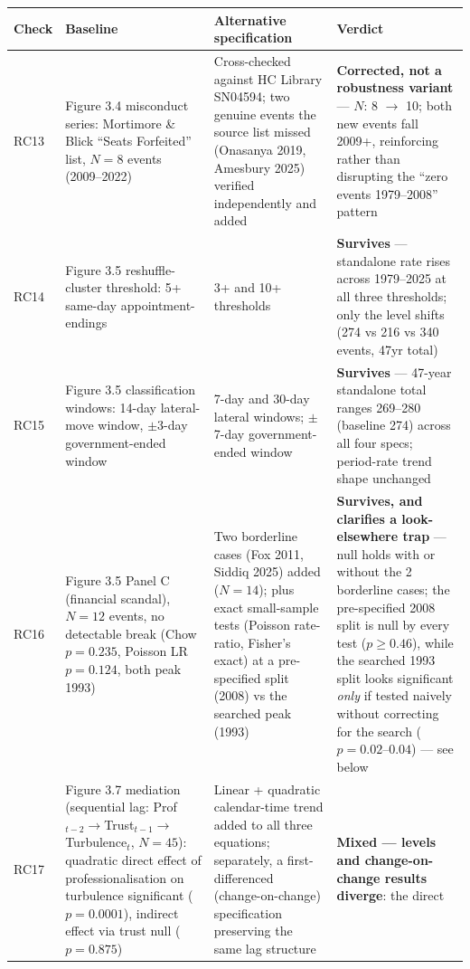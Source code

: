 \begin{threeparttable}
\caption{Robustness checks, Chapter Three}
\label{tab:ch03robustness}
\begin{tabular}{p{1.1cm} p{3.5cm} p{4.3cm} p{3.6cm}}
\toprule
Check & Baseline & Alternative specification & Verdict \\
\midrule
RC13 & Figure 3.4 misconduct series: Mortimore \& Blick ``Seats Forfeited'' list, $N=8$ events
(2009--2022) & Cross-checked against HC Library SN04594; two genuine events the source list missed
(Onasanya 2019, Amesbury 2025) verified independently and added &
\textbf{Corrected, not a robustness variant} --- $N$: 8 $\rightarrow$ 10; both new events fall
2009+, reinforcing rather than disrupting the ``zero events 1979--2008'' pattern \\
RC14 & Figure 3.5 reshuffle-cluster threshold: 5+ same-day appointment-endings & 3+ and 10+
thresholds & \textbf{Survives} --- standalone rate rises across 1979--2025 at all three
thresholds; only the level shifts (274 vs 216 vs 340 events, 47yr total) \\
RC15 & Figure 3.5 classification windows: 14-day lateral-move window, $\pm$3-day
government-ended window & 7-day and 30-day lateral windows; $\pm$7-day government-ended window &
\textbf{Survives} --- 47-year standalone total ranges 269--280 (baseline 274) across all four
specs; period-rate trend shape unchanged \\
RC16 & Figure 3.5 Panel C (financial scandal), $N=12$ events, no detectable break (Chow $p=0.235$,
Poisson LR $p=0.124$, both peak 1993) & Two borderline cases (Fox 2011, Siddiq 2025) added
($N=14$); plus exact small-sample tests (Poisson rate-ratio, Fisher's exact) at a pre-specified
split (2008) vs the searched peak (1993) & \textbf{Survives, and clarifies a look-elsewhere trap}
--- null holds with or without the 2 borderline cases; the pre-specified 2008 split is null by
every test ($p\geq0.46$), while the searched 1993 split looks significant \emph{only} if tested
naively without correcting for the search ($p=0.02$--$0.04$) --- see below \\
RC17 & Figure 3.7 mediation (sequential lag: Prof$_{t-2}\to$Trust$_{t-1}\to$Turbulence$_t$,
$N=45$): quadratic direct effect of professionalisation on turbulence significant ($p=0.0001$),
indirect effect via trust null ($p=0.875$) & Linear + quadratic calendar-time trend added to all
three equations; separately, a first-differenced (change-on-change) specification preserving the
same lag structure & \textbf{Mixed --- levels and change-on-change results diverge}: the direct

\end{tabular}
\end{threeparttable}
